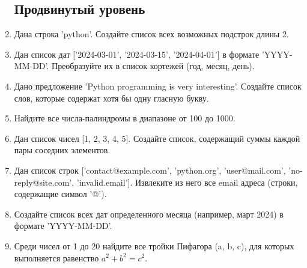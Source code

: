 \documentclass[a4,12pt]{article}
\theoremstyle{remark}
\begin{document}
\begin{enumerate}
    \subsection*{Продвинутый уровень}
    \item Дана строка 'python'. Создайте список всех возможных подстрок длины 2.
    \item Дан список дат ['2024-03-01', '2024-03-15', '2024-04-01'] в формате 'YYYY-MM-DD'. Преобразуйте их в список кортежей (год, месяц, день).
    \item Дано предложение 'Python programming is very interesting'. Создайте список слов, которые содержат хотя бы одну гласную букву.
    \item Найдите все числа-палиндромы в диапазоне от 100 до 1000.
    \item Дан список чисел [1, 2, 3, 4, 5]. Создайте список, содержащий суммы каждой пары соседних элементов.
    \item Дан список строк ['contact@example.com', 'python.org', 'user@mail.com', 'no-reply@site.com', 'invalid.email']. Извлеките из него все email адреса (строки, содержащие символ '@').
    \item Создайте список всех дат определенного месяца (например, март 2024) в формате 'YYYY-MM-DD'.
    \item Среди чисел от 1 до 20 найдите все тройки Пифагора (a, b, c), для которых выполняется равенство $a^2 + b^2 = c^2$.

\end{enumerate}
\end{document}
